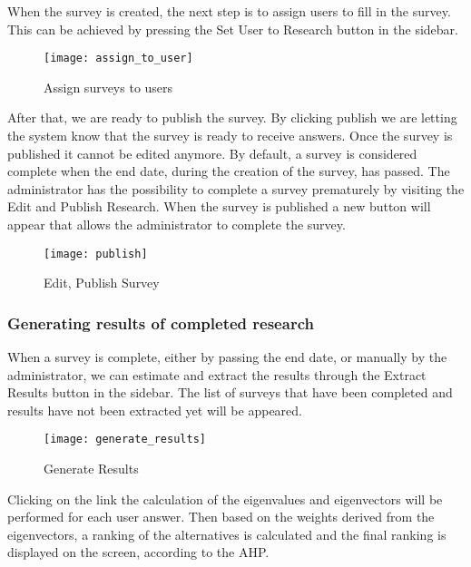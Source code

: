 \documentclass{article}
\begin{document}
When the survey is created, the next step is to assign users to fill in the survey. This can be achieved by pressing the Set User to Research button in the sidebar.





\begin{figure}[h!]
\centering
\texttt{[image: assign\_to\_user]}
\caption{Assign surveys to users}
\label{fig:assign_surveys}
\end{figure}


After that, we are ready to publish the survey. By clicking publish we are letting the system know that the survey is ready to receive answers. Once the survey is published it cannot be edited anymore. By default, a survey is considered complete when the end date, during the creation of the survey, has passed. The administrator has the possibility to complete a survey prematurely by visiting the Edit and Publish Research. When the survey is published a new button will appear that allows the administrator to complete the survey.

\begin{figure}[h!]
\centering
\texttt{[image: publish]}
\caption{Edit, Publish Survey}
\label{fig:edit-publish}
\end{figure}



\subsubsection*{Generating results of completed research}

When a survey is complete, either by passing the end date, or manually by the administrator, we can estimate and extract the results through the Extract Results button in the sidebar. The list of surveys that have been completed and results have not been extracted yet will be appeared.


\begin{figure}[h!]
\centering
\texttt{[image: generate\_results]}
\caption{Generate Results}
\label{fig:generate results}
\end{figure}



Clicking on the link the calculation of the eigenvalues and eigenvectors will be performed for each user answer. Then based on the weights derived from the eigenvectors, a ranking of the alternatives is calculated and the final ranking is displayed on the screen, according to the AHP.
\end{document}

